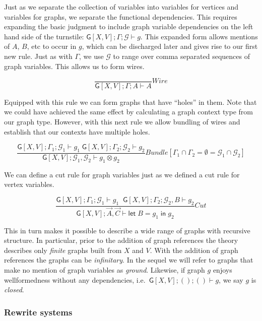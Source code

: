 \documentclass[12pt]{llncs}
\begin{document}
Just as we separate the collection of variables into variables for
vertices and variables for graphs, we separate the functional
dependencies. This requires expanding the basic judgment to include
graph variable dependencies on the left hand side of the turnstile:
\(\mathsf{G}[X,V]; \Gamma; \mathcal{G} \vdash g\). This expanded form
allows mentions of \(A\), \(B\), etc to occur in \(g\), which can be
discharged later and gives rise to our first new rule. Just as with
\(\Gamma\), we use \(\mathcal{G}\) to range over comma separated
sequences of graph variables. This allows us to form wires.

\[\frac{ }{ \mathsf{G}[X,V]; \Gamma; A \vdash A}Wire\]

Equipped with this rule we can form graphs that have ``holes'' in them.
Note that we could have achieved the same effect by calculating a graph
context type from our graph type. However, with this next rule we allow
bundling of wires and establish that our contexts have multiple holes.

\[\frac{ \mathsf{G}[X,V]; \Gamma_1; \mathcal{G}_1 \vdash g_1\; \mathsf{G}[X,V]; \Gamma_2; \mathcal{G}_2 \vdash g_2 }{ \mathsf{G}[X,V]; \mathcal{G}_1, \mathcal{G}_2 \vdash g_1 \otimes g_2 }Bundle [\Gamma_1 \cap \Gamma_2 = \emptyset = \mathcal{G}_1\cap\mathcal{G}_2 ]\]

We can define a cut rule for graph variables just as we defined a cut
rule for vertex variables.

\[\frac{ \mathsf{G}[X,V]; \Gamma_1; \mathcal{G}_1 \vdash g_1 \; \;\mathsf{G}[X,V]; \Gamma_2; \mathcal{G}_2, B \vdash g_2}{ \mathsf{G}[X,V]; \vec{A}, \vec{C} \vdash \mathsf{let}\; B = g_1 \; \mathsf{in}\; g_2}Cut\]

This in turn makes it possible to describe a wide range of graphs with
recursive structure. In particular, prior to the addition of graph
references the theory describes only \emph{finite} graphs built from
\(X\) and \(V\). With the addition of graph references the graphs can be
\emph{infinitary}. In the sequel we will refer to graphs that make no
mention of graph variables as \emph{ground}. Likewise, if graph \(g\)
enjoys wellformedness without any dependencies,
i.e.~\(\mathsf{G}[X,V]; (); () \vdash g\), we say \(g\) is
\emph{closed}.

\hypertarget{rewrite-systems}{%
\subsubsection{Rewrite systems}\label{rewrite-systems}}
\end{document}
